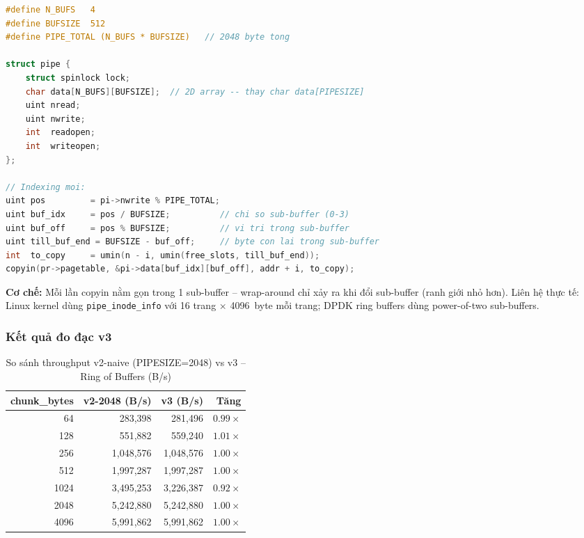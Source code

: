 \documentclass[12pt,a4paper]{article}
\newcommand{\code}[1]{\texttt{#1}}
\begin{document}
\begin{lstlisting}[caption={v3 -- struct pipe với 2D ring buffer (N\_BUFS × BUFSIZE)}, language=C]
#define N_BUFS   4
#define BUFSIZE  512
#define PIPE_TOTAL (N_BUFS * BUFSIZE)   // 2048 byte tong

struct pipe {
    struct spinlock lock;
    char data[N_BUFS][BUFSIZE];  // 2D array -- thay char data[PIPESIZE]
    uint nread;
    uint nwrite;
    int  readopen;
    int  writeopen;
};

// Indexing moi:
uint pos         = pi->nwrite % PIPE_TOTAL;
uint buf_idx     = pos / BUFSIZE;          // chi so sub-buffer (0-3)
uint buf_off     = pos % BUFSIZE;          // vi tri trong sub-buffer
uint till_buf_end = BUFSIZE - buf_off;     // byte con lai trong sub-buffer
int  to_copy     = umin(n - i, umin(free_slots, till_buf_end));
copyin(pr->pagetable, &pi->data[buf_idx][buf_off], addr + i, to_copy);
\end{lstlisting}

\textbf{Cơ chế:} Mỗi lần copyin nằm gọn trong 1 sub-buffer -- wrap-around chỉ xảy
ra khi đổi sub-buffer (ranh giới nhỏ hơn). Liên hệ thực tế: Linux kernel dùng
\code{pipe\_inode\_info} với 16 trang $\times$ 4096~byte mỗi trang; DPDK ring buffers
dùng power-of-two sub-buffers.

\subsubsection{Kết quả đo đạc v3}

\begin{table}[H]
\centering
\caption{So sánh throughput v2-naive (PIPESIZE=2048) vs v3 -- Ring of Buffers (B/s)}
\begin{tabular}{rrrr}
\toprule
\textbf{chunk\_bytes} & \textbf{v2-2048 (B/s)} & \textbf{v3 (B/s)} & \textbf{Tăng} \\
\midrule
64   & 283,398   & 281,496   & $0.99\times$ \\
128  & 551,882   & 559,240   & $1.01\times$ \\
256  & 1,048,576 & 1,048,576 & $1.00\times$ \\
512  & 1,997,287 & 1,997,287 & $1.00\times$ \\
1024 & 3,495,253 & 3,226,387 & $0.92\times$ \\
2048 & 5,242,880 & 5,242,880 & $1.00\times$ \\
4096 & 5,991,862 & 5,991,862 & $1.00\times$ \\
\bottomrule
\end{tabular}
\end{table}
\end{document}
